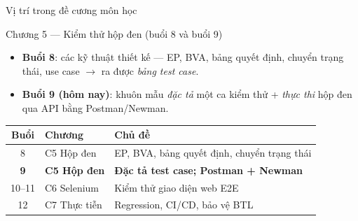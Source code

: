 \documentclass[aspectratio=169,12pt]{beamer}
\begin{document}
\begin{frame}{Vị trí trong đề cương môn học}
  \begin{block}{Chương 5 --- Kiểm thử hộp đen (buổi 8 và buổi 9)}
    \begin{itemize}
      \item \textbf{Buổi 8}: các kỹ thuật thiết kế --- EP, BVA, bảng quyết định,
        chuyển trạng thái, use case $\to$ ra được \emph{bảng test case}.
      \item \textbf{Buổi 9 (hôm nay)}: khuôn mẫu \emph{đặc tả} một ca kiểm thử
        + \emph{thực thi} hộp đen qua API bằng Postman/Newman.
    \end{itemize}
  \end{block}

  \begin{center}
  \small
  \begin{tabular}{cll}
    \toprule
    \textbf{Buổi} & \textbf{Chương} & \textbf{Chủ đề} \\
    \midrule
    8  & C5 Hộp đen & EP, BVA, bảng quyết định, chuyển trạng thái \\
    \textbf{9}  & \textbf{C5 Hộp đen} & \textbf{Đặc tả test case; Postman + Newman} \\
    10--11 & C6 Selenium & Kiểm thử giao diện web E2E \\
    12 & C7 Thực tiễn & Regression, CI/CD, bảo vệ BTL \\
    \bottomrule
  \end{tabular}
  \end{center}
\end{frame}
\end{document}
